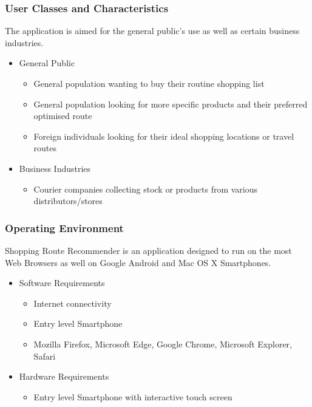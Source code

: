 \documentclass[10pt,twocolumn]{witseiepaper}
\begin{document}
		\subsubsection{User Classes and Characteristics}
		
			The application is aimed for the general public's use as well as certain business industries. 
		
			\begin{itemize}
				\item General Public
				\begin{itemize}
					\item General population wanting to buy their routine shopping list
					\item General population looking for more specific products and their preferred optimised route
					\item Foreign individuals looking for their ideal shopping locations or travel routes
				\end{itemize}
				\item Business Industries
				\begin{itemize}
					\item Courier companies collecting stock or products from various distributors/stores
				\end{itemize}
			\end{itemize}
		
		\subsubsection{Operating Environment}
		
			Shopping Route Recommender is an application designed to run on the most Web Browsers as well on Google Android and Mac OS X Smartphones. 
			
			\begin{itemize}
				\item Software Requirements
				\begin{itemize}
					\item Internet connectivity
					\item Entry level Smartphone
					\item Mozilla Firefox, Microsoft Edge, Google Chrome, Microsoft Explorer, Safari
				\end{itemize}
				\item Hardware Requirements
				\begin{itemize}
					\item Entry level Smartphone with interactive touch screen
				\end{itemize}
			\end{itemize}
		
\end{document}
